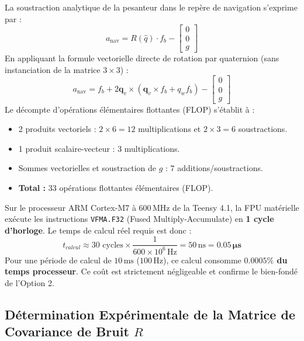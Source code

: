 \documentclass[../Implementation.tex]{subfiles}
\begin{document}
La soustraction analytique de la pesanteur dans le repère de navigation s'exprime par :
\begin{equation}
    a_{\text{nav}} = R(\hat{q}) \cdot f_b - \begin{bmatrix} 0 \\ 0 \\ g \end{bmatrix}
\end{equation}
En appliquant la formule vectorielle directe de rotation par quaternion (sans instanciation de la matrice $3 \times 3$) :
\begin{equation}
    a_{\text{nav}} = f_b + 2 \mathbf{q}_v \times \left( \mathbf{q}_v \times f_b + q_w f_b \right) - \begin{bmatrix} 0 \\ 0 \\ g \end{bmatrix}
\end{equation}
Le décompte d'opérations élémentaires flottantes (FLOP) s'établit à :
\begin{itemize}
    \item 2 produits vectoriels : $2 \times 6 = 12$ multiplications et $2 \times 3 = 6$ soustractions.
    \item 1 produit scalaire-vecteur : $3$ multiplications.
    \item Sommes vectorielles et soustraction de $g$ : $7$ additions/soustractions.
    \item \textbf{Total :} 33 opérations flottantes élémentaires (FLOP).
\end{itemize}

Sur le processeur ARM Cortex-M7 à $600\,\text{MHz}$ de la Teensy 4.1, la FPU matérielle exécute les instructions \lstinline|VFMA.F32| (Fused Multiply-Accumulate) en \textbf{1 cycle d'horloge}. Le temps de calcul réel requis est donc :
\begin{equation}
    t_{calcul} \approx 30 \text{ cycles} \times \frac{1}{600 \times 10^6\,\text{Hz}} = 50\,\text{ns} = \mathbf{0.05\,\mu\text{s}}
\end{equation}
Pour une période de calcul de $10\,\text{ms}$ ($100\,\text{Hz}$), ce calcul consomme \textbf{$0.0005\%$ du temps processeur}. Ce coût est strictement négligeable et confirme le bien-fondé de l'Option 2.

\subsection{Détermination Expérimentale de la Matrice de Covariance de Bruit \texorpdfstring{$R$}{R}}
\end{document}
